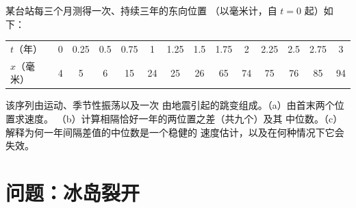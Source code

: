 \begin{exercise}[$\star\star\star$]\label{exo:b1:plate-kinematics:12}
某台站每三个月测得一次、持续三年的东向位置
（以毫米计，自 $t = 0$ 起）如下：
\begin{center}\small
\begin{tabular}{l*{13}{c}}
\hline
$t$（年） & 0 & 0.25 & 0.5 & 0.75 & 1 & 1.25 & 1.5 & 1.75 & 2 & 2.25 & 2.5 & 2.75 & 3\\
$x$（毫米） & 4 & 5 & 6 & 15 & 24 & 25 & 26 & 65 & 74 & 75 & 76 & 85 & 94\\
\hline
\end{tabular}
\end{center}
该序列由运动、季节性振荡以及一次
由地震引起的跳变组成。（a）由首末两个位置求速度。
（b）计算相隔恰好一年的两位置之差（共九个）及其
中位数。（c）解释为何一年间隔差值的中位数是一个稳健的
速度估计，以及在何种情况下它会失效。
\end{exercise}

\section{问题：冰岛裂开}

